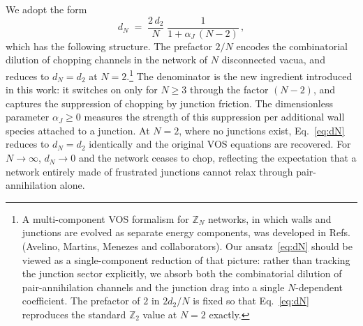 We adopt the form
\begin{equation}
\label{eq:dN}
d_N \;=\; \frac{2\,d_2}{N}\;\frac{1}{1 + \alpha_J\,(N-2)}\,,
\end{equation}
which has the following structure. The prefactor $2/N$ encodes the
combinatorial dilution of chopping channels in the network of $N$
disconnected vacua, and reduces to $d_N\!=\!d_2$ at $N=2$.\footnote{%
A multi-component VOS formalism for $\mathbb{Z}_N$ networks, in which
walls and junctions are evolved as separate energy components, was
developed in Refs.~\cite{} (Avelino, Martins, Menezes and
collaborators). Our ansatz~\eqref{eq:dN} should be viewed as a
single-component reduction of that picture: rather than tracking the
junction sector explicitly, we absorb both the combinatorial dilution
of pair-annihilation channels and the junction drag into a single
$N$-dependent coefficient. The prefactor of $2$ in $2 d_2/N$ is fixed
so that Eq.~\eqref{eq:dN} reproduces the standard $\mathbb{Z}_2$ value
at $N=2$ exactly.} The denominator is the new ingredient introduced in this
work: it switches on only for $N\geq 3$ through the factor $(N-2)$, and
captures the suppression of chopping by junction friction. The
dimensionless parameter $\alpha_J\geq 0$ measures the strength of this
suppression per additional wall species attached to a junction.
At $N=2$, where no junctions exist, Eq.~\eqref{eq:dN} reduces to
$d_N=d_2$ identically and the original VOS equations are recovered. For
$N\to\infty$, $d_N\to 0$ and the network ceases to chop, reflecting the
expectation that a network entirely made of frustrated junctions cannot
relax through pair-annihilation alone.

